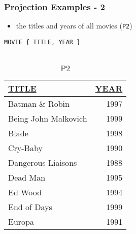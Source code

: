 \documentclass[dvipsnames]{beamer}
\theoremstyle{plain}
\begin{document}
\begin{frame}[fragile]
  \frametitle{Projection Examples - 2}

  \begin{example}
    \begin{itemize}
      \item the titles and years of all movies (\texttt{P2})
    \end{itemize}

    \begin{lstlisting}
MOVIE { TITLE, YEAR }
    \end{lstlisting}

    \pause
    \vspace{-10pt}
    \begin{columns}[b]
      \begin{tiny}
      \begin{table}
        \caption{P2}
        \begin{tabular}{|l|r|}\hline
\underline{TITLE}              & \underline{YEAR}\\[2pt]\hline\hline
Batman \& Robin                & 1997\\\hline
Being John Malkovich           & 1999\\\hline
Blade                          & 1998\\\hline
Cry-Baby                       & 1990\\\hline
Dangerous Liaisons             & 1988\\\hline
Dead Man                       & 1995\\\hline
Ed Wood                        & 1994\\\hline
End of Days                    & 1999\\\hline
Europa                         & 1991\\\hline
        \end{tabular}
      \end{table}
      \end{tiny}


\end{columns}
\end{example}
\end{frame}
\end{document}
